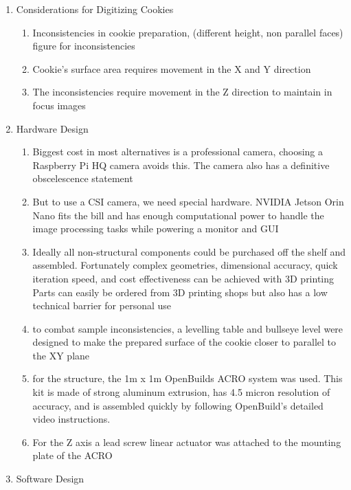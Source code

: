 \documentclass{article}
\begin{document}
\begin{outline}[enumerate]
\begin{enumerate}
		\item Considerations for Digitizing Cookies
			\begin{enumerate}
			\item Inconsistencies in cookie preparation, (different height, non parallel faces)%
				\subitem figure for inconsistencies
			\item Cookie's surface area requires movement in the X and Y direction
			\item The inconsistencies require movement in the Z direction to maintain in focus images
			\end{enumerate}
		\item Hardware Design
			\begin{enumerate}
			\item Biggest cost in most alternatives is a professional camera, choosing a Raspberry Pi HQ camera avoids this. The camera also has a definitive obscelescence statement %
			\item But to use a CSI camera, we need special hardware. NVIDIA Jetson Orin Nano fits the bill and has enough computational power to handle the image processing tasks while powering a monitor and GUI %
			\item Ideally all non-structural components could be purchased off the shelf and assembled. Fortunately complex geometries, dimensional accuracy, quick iteration speed, and cost effectiveness can be achieved with 3D printing  %
				\subitem Parts can easily be ordered from 3D printing shops but also has a low technical barrier for personal use
			\item to combat sample inconsistencies, a levelling table and bullseye level were designed to make the prepared surface of the cookie closer to parallel to the XY plane
			\item for the structure, the 1m x 1m OpenBuilds ACRO system was used. This kit is made of strong aluminum extrusion, has 4.5 micron resolution of accuracy, and is assembled quickly by following OpenBuild's detailed video instructions. %
			\item For the Z axis a lead screw linear actuator was attached to the mounting plate of the ACRO
			\end{enumerate}
		\item Software Design

\end{enumerate}
\end{outline}
\end{document}
